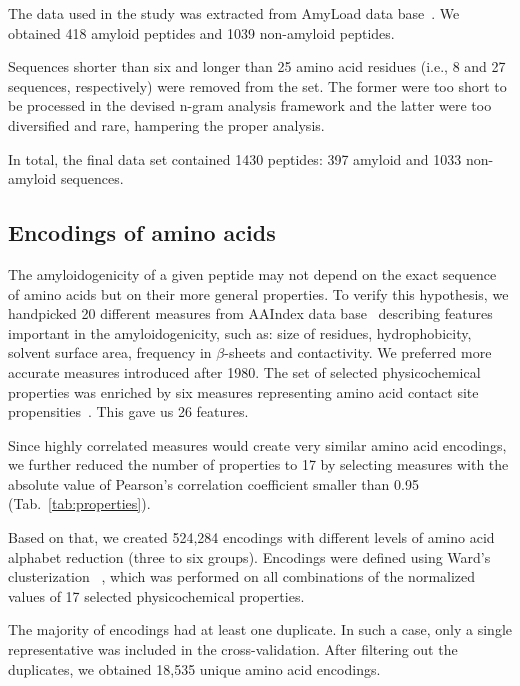 \documentclass[fleqn,10pt,twoside]{gcb15submission}
\begin{document}
The data used in the study was extracted from AmyLoad data 
base~\citep{wozniak_amyload:_2015}. We obtained 418 amyloid peptides and 
1039 non-amyloid peptides.

  Sequences shorter than six and longer than 25 amino acid residues (i.e., 8 and 
27 sequences, respectively) were removed from the set. The former were too short 
to be processed in the devised n-gram analysis framework and the latter were too 
diversified and rare, hampering the proper analysis.

  In total, the final data set contained 1430 peptides: 397 amyloid
and 1033 non-amyloid sequences. 

\subsection{Encodings of amino acids}

The amyloidogenicity of a given peptide may not depend on the exact sequence of 
amino acids but on their more general properties. To verify this hypothesis, we 
handpicked 20 different measures from AAIndex data base~\citep{kawashima_aaindex:_2008} 
describing features important in the amyloidogenicity, such as: size of 
residues, hydrophobicity, solvent surface area, frequency in $\beta$-sheets and 
contactivity. We preferred more accurate measures introduced after 1980. 
The set of selected physicochemical properties was enriched by 
six measures representing amino acid contact site 
propensities~\cite{wozniak_characteristics_2014}. This gave us  26 features.

  Since highly correlated measures would create very similar amino acid 
encodings, we further reduced the number of properties to 17 by selecting 
measures with the absolute value of Pearson's correlation coefficient smaller 
than 0.95 (Tab.~\ref{tab:properties}). 

  Based on that, we created 524,284 encodings with different levels of amino 
acid alphabet reduction (three to six groups). Encodings were defined using 
Ward's clusterization ~\citep{joe_h._ward_jr_hierarchical_1963}, which was 
performed on all combinations of the normalized values of 17 selected 
physicochemical properties.

  The majority of encodings had at least one duplicate. In such a case, only a 
single representative was included in the cross-validation. After filtering out the 
duplicates, we obtained 18,535 unique amino acid encodings.
\end{document}
